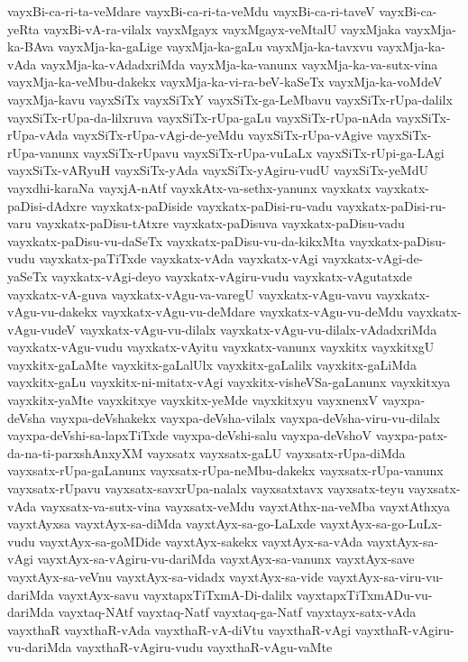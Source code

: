 {vayxBi-ca-ri-ta-veMdare
vayxBi-ca-ri-ta-veMdu
vayxBi-ca-ri-taveV
vayxBi-ca-yeRta
vayxBi-vA-ra-vilalx
vayxMgayx
vayxMgayx-veMtalU
vayxMjaka
vayxMja-ka-BAva
vayxMja-ka-gaLige
vayxMja-ka-gaLu
vayxMja-ka-tavxvu
vayxMja-ka-vAda
vayxMja-ka-vAdadxriMda
vayxMja-ka-vanunx
vayxMja-ka-va-sutx-vina
vayxMja-ka-veMbu-dakekx
vayxMja-ka-vi-ra-beV-kaSeTx
vayxMja-ka-voMdeV
vayxMja-kavu
vayxSiTx
vayxSiTxY
vayxSiTx-ga-LeMbavu
vayxSiTx-rUpa-dalilx
vayxSiTx-rUpa-da-lilxruva
vayxSiTx-rUpa-gaLu
vayxSiTx-rUpa-nAda
vayxSiTx-rUpa-vAda
vayxSiTx-rUpa-vAgi-de-yeMdu
vayxSiTx-rUpa-vAgive
vayxSiTx-rUpa-vanunx
vayxSiTx-rUpavu
vayxSiTx-rUpa-vuLaLx
vayxSiTx-rUpi-ga-LAgi
vayxSiTx-vARyuH
vayxSiTx-yAda
vayxSiTx-yAgiru-vudU
vayxSiTx-yeMdU
vayxdhi-karaNa
vayxjA-nAtf
vayxkAtx-va-sethx-yanunx
vayxkatx
vayxkatx-paDisi-dAdxre
vayxkatx-paDiside
vayxkatx-paDisi-ru-vadu
vayxkatx-paDisi-ru-varu
vayxkatx-paDisu-tAtxre
vayxkatx-paDisuva
vayxkatx-paDisu-vadu
vayxkatx-paDisu-vu-daSeTx
vayxkatx-paDisu-vu-da-kikxMta
vayxkatx-paDisu-vudu
vayxkatx-paTiTxde
vayxkatx-vAda
vayxkatx-vAgi
vayxkatx-vAgi-de-yaSeTx
vayxkatx-vAgi-deyo
vayxkatx-vAgiru-vudu
vayxkatx-vAgutatxde
vayxkatx-vA-guva
vayxkatx-vAgu-va-varegU
vayxkatx-vAgu-vavu
vayxkatx-vAgu-vu-dakekx
vayxkatx-vAgu-vu-deMdare
vayxkatx-vAgu-vu-deMdu
vayxkatx-vAgu-vudeV
vayxkatx-vAgu-vu-dilalx
vayxkatx-vAgu-vu-dilalx-vAdadxriMda
vayxkatx-vAgu-vudu
vayxkatx-vAyitu
vayxkatx-vanunx
vayxkitx
vayxkitxgU
vayxkitx-gaLaMte
vayxkitx-gaLalUlx
vayxkitx-gaLalilx
vayxkitx-gaLiMda
vayxkitx-gaLu
vayxkitx-ni-mitatx-vAgi
vayxkitx-visheVSa-gaLanunx
vayxkitxya
vayxkitx-yaMte
vayxkitxye
vayxkitx-yeMde
vayxkitxyu
vayxnenxV
vayxpa-deVsha
vayxpa-deVshakekx
vayxpa-deVsha-vilalx
vayxpa-deVsha-viru-vu-dilalx
vayxpa-deVshi-sa-lapxTiTxde
vayxpa-deVshi-salu
vayxpa-deVshoV
vayxpa-patx-da-na-ti-parxshAnxyXM
vayxsatx
vayxsatx-gaLU
vayxsatx-rUpa-diMda
vayxsatx-rUpa-gaLanunx
vayxsatx-rUpa-neMbu-dakekx
vayxsatx-rUpa-vanunx
vayxsatx-rUpavu
vayxsatx-savxrUpa-nalalx
vayxsatxtavx
vayxsatx-teyu
vayxsatx-vAda
vayxsatx-va-sutx-vina
vayxsatx-veMdu
vayxtAthx-na-veMba
vayxtAthxya
vayxtAyxsa
vayxtAyx-sa-diMda
vayxtAyx-sa-go-LaLxde
vayxtAyx-sa-go-LuLx-vudu
vayxtAyx-sa-goMDide
vayxtAyx-sakekx
vayxtAyx-sa-vAda
vayxtAyx-sa-vAgi
vayxtAyx-sa-vAgiru-vu-dariMda
vayxtAyx-sa-vanunx
vayxtAyx-save
vayxtAyx-sa-veVnu
vayxtAyx-sa-vidadx
vayxtAyx-sa-vide
vayxtAyx-sa-viru-vu-dariMda
vayxtAyx-savu
vayxtapxTiTxmA-Di-dalilx
vayxtapxTiTxmADu-vu-dariMda
vayxtaq-NAtf
vayxtaq-Natf
vayxtaq-ga-Natf
vayxtayx-satx-vAda
vayxthaR
vayxthaR-vAda
vayxthaR-vA-diVtu
vayxthaR-vAgi
vayxthaR-vAgiru-vu-dariMda
vayxthaR-vAgiru-vudu
vayxthaR-vAgu-vaMte
}
